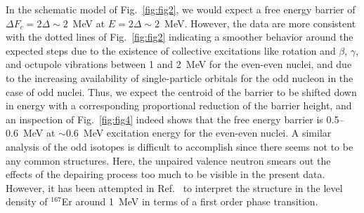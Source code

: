 \begin{multicols}{2}
In the schematic model of Fig.\ \ref{fig:fig2}, we would expect a free energy 
barrier of $\Delta F_c=2\Delta\sim 2$~MeV at $E=2\Delta\sim 2$~MeV. However, 
the data are more consistent with the dotted lines of Fig.\ \ref{fig:fig2} 
indicating a smoother behavior around the expected steps due to the existence 
of collective excitations like rotation and $\beta$, $\gamma$, and octupole 
vibrations between 1 and 2~MeV for the even-even nuclei, and due to the 
increasing availability of single-particle orbitals for the odd nucleon in the 
case of odd nuclei. Thus, we expect the centroid of the barrier to be shifted 
down in energy with a corresponding proportional reduction of the barrier 
height, and an inspection of Fig.\ \ref{fig:fig4} indeed shows that the free 
energy barrier is 0.5--0.6~MeV at $\sim 0.6$~MeV excitation energy for the
even-even nuclei. A similar analysis of the odd isotopes is difficult to 
accomplish since there seems not to be any common structures. Here, the 
unpaired valence neutron smears out the effects of the depairing process too 
much to be visible in the present data. However, it has been attempted in Ref.\
\cite{MG01} to interpret the structure in the level density of $^{167}$Er 
around 1~MeV in terms of a first order phase transition.


\end{multicols}
